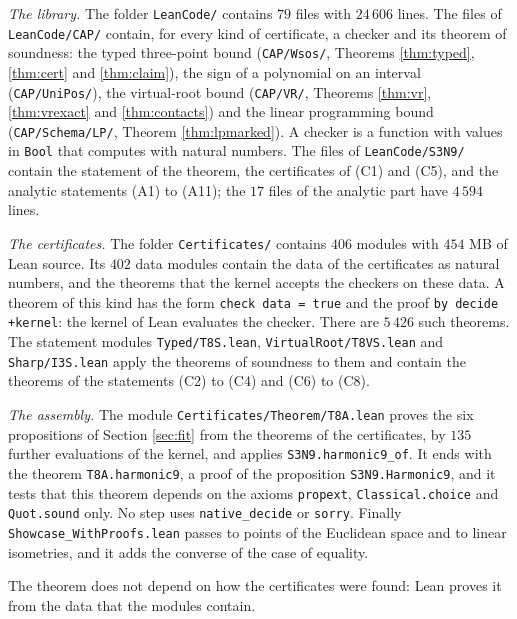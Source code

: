 \documentclass[reqno,a4paper,11pt]{amsart}
\numberwithin{equation}{section}
\newcommand{\lean}[1]{\texttt{#1}}
\newcommand{\file}[1]{\nolinkurl{#1}}
\begin{document}
\emph{The library.} The folder \file{LeanCode/} contains $79$ files with $24\,606$ lines. The files of \file{LeanCode/CAP/} contain, for every kind of certificate, a checker and its theorem of soundness: the typed three-point bound (\file{CAP/Wsos/}, Theorems \ref{thm:typed}, \ref{thm:cert} and \ref{thm:claim}), the sign of a polynomial on an interval (\file{CAP/UniPos/}), the virtual-root bound (\file{CAP/VR/}, Theorems \ref{thm:vr}, \ref{thm:vrexact} and \ref{thm:contacts}) and the linear programming bound (\file{CAP/Schema/LP/}, Theorem \ref{thm:lpmarked}). A checker is a function with values in \lean{Bool} that computes with natural numbers. The files of \file{LeanCode/S3N9/} contain the statement of the theorem, the certificates of (C1) and (C5), and the analytic statements (A1) to (A11); the $17$ files of the analytic part have $4\,594$ lines.

\emph{The certificates.} The folder \file{Certificates/} contains $406$ modules with $454$ MB of Lean source. Its $402$ data modules contain the data of the certificates as natural numbers, and the theorems that the kernel accepts the checkers on these data. A theorem of this kind has the form \lean{check data = true} and the proof \lean{by decide +kernel}: the kernel of Lean evaluates the checker. There are $5\,426$ such theorems. The statement modules \file{Typed/T8S.lean}, \file{VirtualRoot/T8VS.lean} and \file{Sharp/I3S.lean} apply the theorems of soundness to them and contain the theorems of the statements (C2) to (C4) and (C6) to (C8).

\emph{The assembly.} The module \file{Certificates/Theorem/T8A.lean} proves the six propositions of Section \ref{sec:fit} from the theorems of the certificates, by $135$ further evaluations of the kernel, and applies \lean{S3N9.harmonic9\_of}. It ends with the theorem \lean{T8A.harmonic9}, a proof of the proposition \lean{S3N9.Harmonic9}, and it tests that this theorem depends on the axioms \lean{propext}, \lean{Classical.choice} and \lean{Quot.sound} only. No step uses \lean{native\_decide} or \lean{sorry}. Finally \file{Showcase_WithProofs.lean} passes to points of the Euclidean space and to linear isometries, and it adds the converse of the case of equality.

The theorem does not depend on how the certificates were found: Lean proves it from the data that the modules contain.
\end{document}
